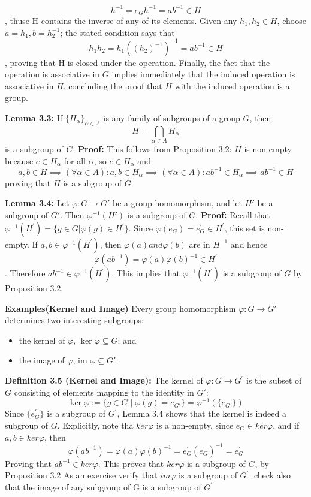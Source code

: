 $$h^{-1} = e_Gh^{-1}=ab^{-1} \in H$$, thuse H contains the inverse of any of its elements. Given any $h_1,h_2 \in H$, choose $a=h_1, b=h_2^{-1}$; the stated condition says that
$$h_1h_2 = h_1((h_2)^{-1})^{-1} = ab^{-1} \in H$$, proving that H is closed under the operation. Finally, the fact that the operation is associative in $G$ implies immediately that the induced operation is associative in $H$, concluding the proof that $H$ with the induced operation is a group.

\textbf{Lemma 3.3:} If $\{H_\alpha\}_{\alpha \in A}$ is any family of subgroups of a group $G$, then
$$ H = \bigcap_{\alpha \in A} H_\alpha $$
is a subgroup of $G$.
\textbf{Proof:} This follows from Proposition 3.2: $H$ is non-empty because $e \in H_\alpha$ for all $\alpha$, so $e \in H_\alpha$ and
$$a,b \in H \implies (\forall \alpha \in A): a,b \in H_\alpha \implies (\forall \alpha \in A) : ab^{-1} \in H_\alpha \implies ab^{-1} \in H$$ proving that $H$ is a subgroup of $G$

\textbf{Lemma 3.4:} Let $\varphi : G \to G'$ be a group homomorphism, and let $H'$ be a subgroup of $G'$. Then $\varphi^{-1}(H')$ is a subgroup of $G$.
\textbf{Proof:} Recall that $\varphi^{-1}(H^\prime) = \{g \in G| \varphi(g) \in H^\prime \}$. Since $\varphi(e_G) = e_G^\prime \in H^\prime$, this set is non-empty. If $a,b \in \varphi^{-1}(H^\prime)$, then $\varphi(a) and \varphi(b)$ are in $H^{-1}$ and hence
$$\varphi(ab^{-1}) = \varphi(a)\varphi(b)^{-1} \in H^\prime$$. Therefore $ab^{-1} \in \varphi^{-1}(H^\prime)$. This implies that $\varphi^{-1}(H^\prime)$ is a subgroup of $G$ by Proposition 3.2.

\textbf{Examples(Kernel and Image)}
Every group homomorphism $\varphi : G \to G'$ determines two interesting subgroups:
\begin{itemize}
    \item the kernel of $\varphi$, $\ker \varphi \subseteq G$; and
    \item the image of $\varphi$, $\text{im } \varphi \subseteq G'$.
\end{itemize}
\textbf{Definition 3.5 (Kernel and Image):}
The kernel of $\varphi : G \to G^\prime$ is the subset of $G$ consisting of elements mapping to the identity in $G'$:
$$ \ker \varphi := \{ g \in G \mid \varphi(g) = e_{G'} \} = \varphi^{-1}(\{e_{G'}\}) $$
Since $\{e_G^\prime\}$ is a subgroup of $G^\prime$, Lemma 3.4 shows that the kernel is indeed a subgroup of $G$. Explicitly, note tha $ker\varphi$ is a non-empty, since $e_G \in ker\varphi$, and if $a,b \in ker\varphi$, then
$$\varphi(ab^{-1}) = \varphi(a) \varphi(b)^{-1} = e_G^\prime (e_G^\prime)^{-1}=e_G^\prime$$ Proving that $ab^{-1} \in ker\varphi$. This proves that $ker\varphi$ is a subgroup of $G$, by Proposition 3.2
As an exercise verify that $im\varphi$ is a subgroup of $G^\prime$. check also that the image of any subgroup of G is a subgroup of $G^\prime$

